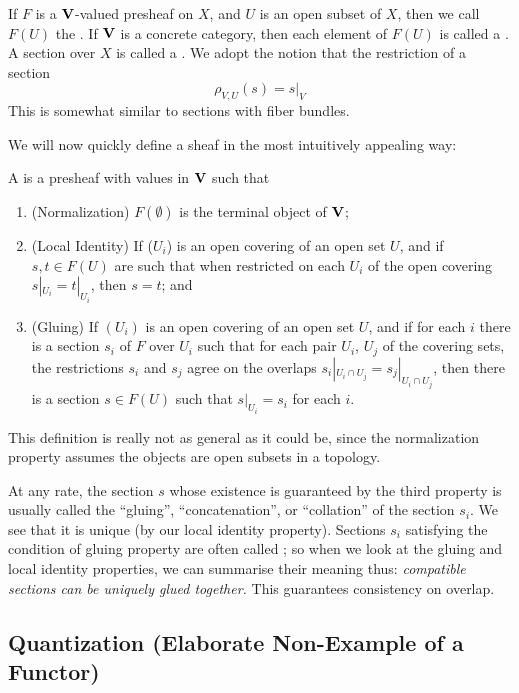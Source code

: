 If $F$ is a $\mathbf{V}$-valued presheaf on $X$, and $U$ is an open
subset of $X$, then we call $F(U)$ the . If $\mathbf{V}$ is a concrete category, then each
element of $F(U)$ is called a . A section over
$X$ is called a . We adopt the notion that
the restriction of a section
\begin{equation}%
\rho_{V,U}(s)=s|_{V}
\end{equation}
This is somewhat similar to sections with fiber bundles.

We will now quickly define a sheaf in the most intuitively appealing
way:
\begin{defn}\label{defn:sheaf}
A  is a
presheaf with values in $\mathbf{V}$ such that
\begin{enumerate}
\item{(Normalization)} $F(\emptyset)$ is the terminal object of
  $\mathbf{V}$;
\item{(Local Identity)} If ($U_i$) is an open covering of an open
set $U$, and if $s,t\in F(U)$ are such that when restricted on
each $U_i$ of the open covering $s|_{U_i}=t|_{U_i}$, then $s=t$;
and
\item{(Gluing)} If $(U_i)$ is an open covering of an open set
  $U$, and if for each $i$ there is a section $s_i$ of $F$ over
  $U_i$ such that for each pair $U_i$, $U_j$ of the covering
  sets, the restrictions $s_i$ and $s_j$ agree on the overlaps
  $s_{i}|_{U_{i}\cap U_{j}}=s_{j}|_{U_{i}\cap U_{j}}$, then there
  is a section $s\in F(U)$ such that $s|_{U_i}=s_i$ for each $i$.
\end{enumerate}
\end{defn}
This definition is really not as general as it could be, since
the normalization property assumes the objects are open subsets
in a topology.

At any rate, the section $s$ whose existence is guaranteed by the
third property is usually called the ``gluing'',
``concatenation'', or ``collation'' of the section $s_{i}$. We
see that it is unique (by our local identity property). Sections
$s_{i}$ satisfying the condition of gluing property are often called
; so when we look at the gluing and local
identity properties, we can summarise their meaning thus:
\emph{compatible sections can be uniquely glued together.} This
guarantees consistency on overlap.

\subsection{Quantization (Elaborate Non-Example of a Functor)}

